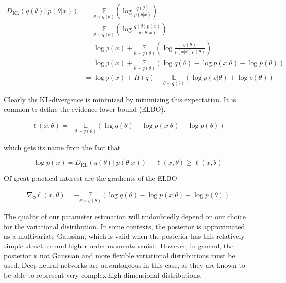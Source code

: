 \documentclass{ucetd}
\begin{document}
\begin{align*}
D_{\mathrm{KL}}(q(\theta)||p(\theta|x)) &= \underset{{\theta \sim q(\theta)}}{\mathbb{E}}\left(\log\frac{q(\theta)}{p(\theta|x)}\right)\\
&=  \underset{{\theta \sim q(\theta)}}{\mathbb{E}}\left(\log\frac{q(\theta)p(x)}{p(\theta,x)}\right)\\
&=  \log p(x) + \underset{{\theta \sim q(\theta)}}{\mathbb{E}}\left(\log\frac{q(\theta)}{p(x|\theta)p(\theta)}\right)\\
&= \log p(x) + \underset{{\theta \sim q(\theta)}}{\mathbb{E}}\left(\log q(\theta) - \log p(x|\theta) - \log p(\theta) \right)\\
&= \log p(x) + H(q) -\underset{{\theta \sim q(\theta)}}{\mathbb{E}}\left(\log p(x|\theta) + \log p(\theta) \right)
\end{align*}

Clearly the KL-divergence is minimized by minimizing this expectation. It is common to define the evidence lower bound (ELBO).

\begin{align}
\ell(x,\theta) = - \underset{{\theta \sim q(\theta)}}{\mathbb{E}}\left(\log q(\theta) - \log p(x|\theta) - \log p(\theta) \right)
\end{align}

which gets its name from the fact that

\begin{equation*}
\log p(x) = D_{\mathrm{KL}}(q(\theta)||p(\theta|x)) + \ell(x,\theta) \geq \ell(x,\theta)
\end{equation*}

Of great practical interest are the gradients of the ELBO

\begin{align*}
\nabla_{\Phi}\ell(x,\theta) = - \underset{{\theta \sim q(\theta)}}{\mathbb{E}}\left(\log q(\theta) - \log p(x|\theta) - \log p(\theta) \right)
\end{align*}

The quality of our parameter estimation will undoubtedly depend on our choice for the variational distribution. In some contexts, the posterior is approximated as a multivariate Gaussian, which is valid when the posterior has this relatively simple structure and higher order moments vanish. However, in general, the posterior is not Gaussian and more flexible variational distributions must be used. Deep neural networks are advantageous in this case, as they are known to be able to represent very complex high-dimensional distributions. 
\end{document}
